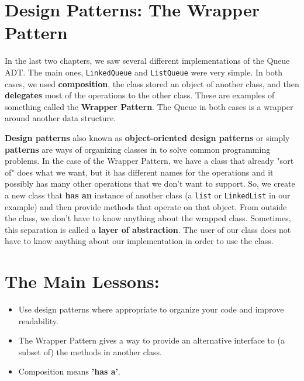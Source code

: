 \section{Design Patterns:  The Wrapper Pattern}


In the last two chapters, we saw several different implementations of the Queue ADT.
The main ones, \texttt{LinkedQueue} and \texttt{ListQueue} were very simple.
In both cases, we used \textbf{composition}, the class stored an object of another class, and then \textbf{delegates} most of the operations to the other class.
These are examples of something called the \textbf{Wrapper Pattern}.
The Queue in both cases is a wrapper around another data structure.


\textbf{Design patterns} also known as \textbf{object-oriented design patterns} or simply \textbf{patterns} are ways of organizing classes in to solve common programming problems.
In the case of the Wrapper Pattern, we have a class that already "sort of" does what we want, but it has different names for the operations and it possibly has many other operations that we don't want to support.
So, we create a new class that \textbf{has an} instance of another class (a \texttt{list} or \texttt{LinkedList} in our example) and then provide methods that operate on that object.
From outside the class, we don't have to know anything about the wrapped class.
Sometimes, this separation is called a \textbf{layer of abstraction}.
The user of our class does not have to know anything about our implementation in order to use the class.

\section{The Main Lessons:}

\begin{itemize}

\item Use design patterns where appropriate to organize your code and improve readability.

\item The Wrapper Pattern gives a way to provide an alternative interface to (a subset of) the methods in another class.

\item Composition means \textbf{'has a'}.

\end{itemize}